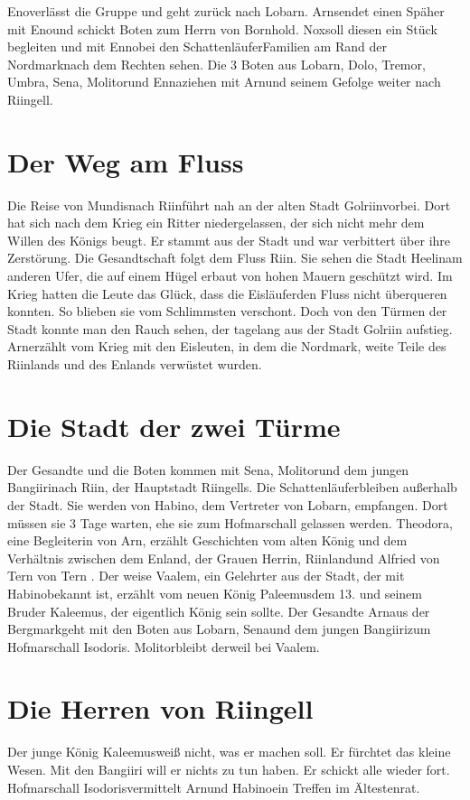 \documentclass[12pt,a4paper,onecolumn,twoside,ngerman]{book}
\newcommand{\Tern}{Tern }
\newcommand{\Molitor}{Molitor}
\newcommand{\Sena}{Sena}
\newcommand{\Bangiri}{Bangiiri}
\newcommand{\Arwed}{Alfried von \Tern}
\newcommand{\Enland}{Enland}
\newcommand{\Schattenlaufer}{Schattenläufer}
\newcommand{\Eno}{Eno}
\newcommand{\Dolo}{Dolo}
\newcommand{\Nox}{Nox}
\newcommand{\Umbra}{Umbra}
\newcommand{\Enna}{Enna}
\newcommand{\Enno}{Enno}
\newcommand{\Tremor}{Tremor}
\newcommand{\Lobarn}{Lobarn}
\newcommand{\Nordmark}{Nordmark}
\newcommand{\Bergmark}{Bergmark}
\newcommand{\Bornhold}{Bornhold}
\newcommand{\Arn}{Arn}
\newcommand{\Eislaufer}{Eisläufer}
\newcommand{\Theodora}{Theodora}
\newcommand{\Rhinland}{Riinland}
\newcommand{\Rhingell}{Riingell}
\newcommand{\Mundis}{Mundis}
\newcommand{\Helin}{Heelin}
\newcommand{\Golrin}{Golriin}
\newcommand{\Rhin}{Riin}
\newcommand{\Habino}{Habino}
\newcommand{\Valem}{Vaalem}
\newcommand{\Palemus}{Paleemus}
\newcommand{\Kalemus}{Kaleemus}
\newcommand{\Isodoris}{Isodoris}
\begin{document}
\Eno  verlässt die Gruppe und geht zurück nach \Lobarn . \Arn  sendet einen Späher mit \Eno  und schickt  Boten zum Herrn von \Bornhold . \Nox  soll diesen ein Stück begleiten und mit \Enno  bei den \Schattenlaufer  Familien am Rand der \Nordmark  nach dem Rechten sehen. Die 3 Boten aus \Lobarn , \Dolo , \Tremor , \Umbra, \Sena , \Molitor  und \Enna  ziehen mit \Arn  und seinem Gefolge weiter nach \Rhingell . 

\section{Der Weg am Fluss}
Die Reise von \Mundis  nach \Rhin  führt nah an der alten Stadt \Golrin  vorbei. Dort hat sich nach dem Krieg ein Ritter niedergelassen, der sich nicht mehr dem Willen des Königs beugt. Er stammt aus der Stadt und war verbittert über ihre Zerstörung. Die Gesandtschaft folgt dem Fluss \Rhin . Sie sehen die Stadt \Helin  am anderen Ufer, die auf einem Hügel erbaut von hohen Mauern geschützt wird. Im Krieg hatten die Leute das Glück, dass die \Eislaufer  den Fluss nicht überqueren konnten. So blieben sie vom Schlimmsten verschont. Doch von den Türmen der Stadt konnte man den Rauch sehen, der tagelang aus der Stadt \Golrin   
  aufstieg. 
\Arn erzählt vom Krieg mit den Eisleuten, in dem die \Nordmark , weite Teile des \Rhinland s und des \Enland s verwüstet wurden. 

\section{Die Stadt der zwei Türme}
Der Gesandte und die Boten kommen mit \Sena , \Molitor  und  dem jungen \Bangiri  nach \Rhin , der Hauptstadt \Rhingell{s}. Die \Schattenlaufer  bleiben außerhalb der Stadt. Sie werden von \Habino , dem Vertreter von \Lobarn , empfangen. Dort müssen sie 3 Tage warten, ehe sie zum Hofmarschall gelassen werden. \Theodora , eine Begleiterin von \Arn , erzählt Geschichten vom alten König und dem Verhältnis zwischen dem \Enland , der Grauen Herrin, \Rhinland und \Arwed von \Tern. 
Der weise \Valem , ein Gelehrter aus der Stadt, der mit \Habino  bekannt ist, erzählt vom neuen König \Palemus dem 13. und seinem Bruder \Kalemus , der eigentlich König sein sollte. Der Gesandte \Arn  aus der \Bergmark  geht mit den Boten aus \Lobarn , \Sena  und dem jungen \Bangiri  zum Hofmarschall \Isodoris.  \Molitor  bleibt derweil bei \Valem .

\section{Die Herren von \Rhingell}
Der junge König \Kalemus  weiß nicht, was er machen soll. Er fürchtet das kleine Wesen. Mit den \Bangiri  
  will er nichts zu tun haben. Er schickt alle wieder fort. Hofmarschall \Isodoris vermittelt \Arn und \Habino ein Treffen im Ältestenrat. 
\end{document}
